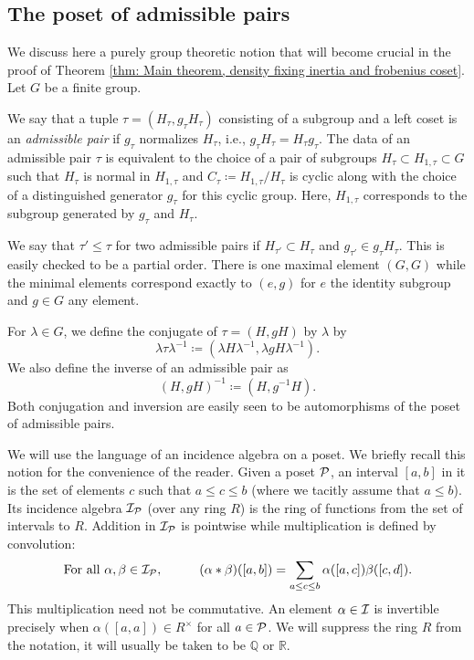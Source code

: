 \documentclass[10pt]{article}
\theoremstyle{plain}
\theoremstyle{definition}
\numberwithin{equation}{section}
\begin{document}
\subsection{The poset of admissible pairs}\label{section: admissible pairs}

We discuss here a purely group theoretic notion that will become crucial in the proof of Theorem \ref{thm: Main theorem, density fixing inertia and frobenius coset}. Let $G$ be a finite group.

We say that a tuple $\tau = (H_\tau,g_\tau H_\tau)$ consisting of a subgroup and a left coset is an \emph{admissible pair} if $g_\tau$ normalizes $H_\tau$, i.e., $g_\tau H_\tau = H_\tau g_\tau$. The data of an admissible pair $\tau$ is equivalent to the choice of a pair of subgroups $H_{\tau} \subset H_{1,\tau} \subset G$ such that $H_\tau$ is normal in $H_{1,\tau}$ and $C_\tau \coloneqq H_{1,\tau}/H_{\tau}$ is cyclic along with the choice of a distinguished generator $g_\tau$ for this cyclic group. Here, $H_{1,\tau}$ corresponds to the subgroup generated by $g_{\tau}$ and $H_{\tau}$.

We say that $\tau' \leq \tau$ for two admissible pairs if $H_{\tau'} \subset H_{\tau}$ and $g_{\tau'} \in g_{\tau}H_{\tau}$. This is easily checked to be a partial order. There is one maximal element $(G,G)$ while the minimal elements correspond exactly to $(e,g)$ for $e$ the identity subgroup and $g \in G$ any element.

For $\lambda \in G$, we define the conjugate of $\tau = (H,gH)$ by $\lambda$ by
\[\lambda \tau \lambda^{-1} \coloneqq (\lambda H \lambda^{-1}, \lambda gH \lambda^{-1}).\]
We also define the inverse of an admissible pair as
\[(H,gH)^{-1} \coloneqq (H,g^{-1}H).\]
Both conjugation and inversion are easily seen to be automorphisms of the poset of admissible pairs. 


We will use the language of an incidence algebra on a poset. We briefly recall this notion for the convenience of the reader. Given a poset ${\mathcal P}$, an interval $[a,b]$ in it is the set of elements $c$ such that $a \leq c \leq b$ (where we tacitly assume that $a\leq b$). Its incidence algebra ${\mathcal I}_{{\mathcal P}}$ (over any ring $R$) is the ring of functions from the set of intervals to $R$. Addition in ${\mathcal I}_{{\mathcal P}}$ is pointwise while multiplication is defined by convolution:
\[\text{For all } \alpha,\beta \in \cI_{\cP}, \hspace{10 mm} (\alpha\ast\beta)([a,b]) = \sum_{a \leq c \leq b}\alpha([a,c])\beta([c,d]).\]
This multiplication need not be commutative. An element $\alpha \in {\mathcal I}$ is invertible precisely when $\alpha([a,a]) \in R^\times$ for all $a \in {\mathcal P}$. We will suppress the ring $R$ from the notation, it will usually be taken to be $\mathbb Q$ or $\mathbb R$.
\end{document}
